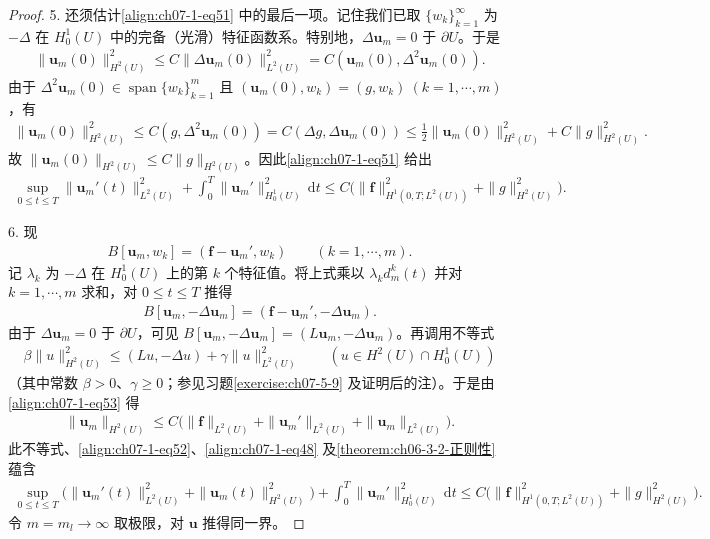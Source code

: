\documentclass[../../main.tex]{subfiles}
\begin{document}
\begin{proof}
5. 还须估计\eqref{align:ch07-1-eq51} 中的最后一项。记住我们已取 $\{w_k\}_{k=1}^\infty$ 为 $-\Delta$ 在 $H^1_0(U)$ 中的完备（光滑）特征函数系。特别地，$\Delta\mathbf{u}_m=0$ 于 $\partial U$。于是
\begin{align*}
\|\mathbf{u}_m(0)\|_{H^2(U)}^2 \leqslant C\|\Delta\mathbf{u}_m(0)\|_{L^2(U)}^2 = C(\mathbf{u}_m(0),\Delta^2\mathbf{u}_m(0)).
\end{align*}
由于 $\Delta^2\mathbf{u}_m(0)\in\operatorname{span}\{w_k\}_{k=1}^m$ 且 $(\mathbf{u}_m(0),w_k)=(g,w_k)\ (k=1,\cdots,m)$，有
\begin{align*}
\|\mathbf{u}_m(0)\|_{H^2(U)}^2 \leqslant C(g,\Delta^2\mathbf{u}_m(0)) = C(\Delta g,\Delta\mathbf{u}_m(0)) \leqslant \frac12\|\mathbf{u}_m(0)\|_{H^2(U)}^2 + C\|g\|_{H^2(U)}^2.
\end{align*}
故 $\|\mathbf{u}_m(0)\|_{H^2(U)}\leqslant C\|g\|_{H^2(U)}$。因此\eqref{align:ch07-1-eq51} 给出
\begin{align}
\sup_{0\leqslant t\leqslant T}\|\mathbf{u}_m'(t)\|_{L^2(U)}^2 + \int_0^T \|\mathbf{u}_m'\|_{H^1_0(U)}^2\,\mathrm{d}t
\leqslant C\bigl(\|\mathbf{f}\|_{H^1(0,T;L^2(U))}^2+\|g\|_{H^2(U)}^2\bigr).\label{align:ch07-1-eq52}
\end{align}

6. 现
\begin{align*}
B[\mathbf{u}_m,w_k]=(\mathbf{f}-\mathbf{u}_m',w_k)\qquad (k=1,\cdots,m).
\end{align*}
记 $\lambda_k$ 为 $-\Delta$ 在 $H^1_0(U)$ 上的第 $k$ 个特征值。将上式乘以 $\lambda_k d_m^k(t)$ 并对 $k=1,\cdots,m$ 求和，对 $0\leqslant t\leqslant T$ 推得
\begin{align}
B[\mathbf{u}_m,-\Delta\mathbf{u}_m]=(\mathbf{f}-\mathbf{u}_m',-\Delta\mathbf{u}_m).\label{align:ch07-1-eq53}
\end{align}
由于 $\Delta\mathbf{u}_m=0$ 于 $\partial U$，可见 $B[\mathbf{u}_m,-\Delta\mathbf{u}_m]=(L\mathbf{u}_m,-\Delta\mathbf{u}_m)$。再调用不等式
\begin{align}
\beta\|u\|_{H^2(U)}^2 \leqslant (Lu,-\Delta u)+\gamma\|u\|_{L^2(U)}^2\qquad (u\in H^2(U)\cap H^1_0(U))\label{align:ch07-1-eq54}
\end{align}
（其中常数 $\beta>0$、$\gamma\geqslant 0$；参见习题\cref{exercise:ch07-5-9} 及证明后的注）。于是由\eqref{align:ch07-1-eq53} 得
\begin{align*}
\|\mathbf{u}_m\|_{H^2(U)} \leqslant C\bigl(\|\mathbf{f}\|_{L^2(U)}+\|\mathbf{u}_m'\|_{L^2(U)}+\|\mathbf{u}_m\|_{L^2(U)}\bigr).
\end{align*}
此不等式、\eqref{align:ch07-1-eq52}、\eqref{align:ch07-1-eq48} 及\cref{theorem:ch06-3-2-正则性} 蕴含
\begin{align*}
\sup_{0\leqslant t\leqslant T}\bigl(\|\mathbf{u}_m'(t)\|_{L^2(U)}^2+\|\mathbf{u}_m(t)\|_{H^2(U)}^2\bigr) + \int_0^T \|\mathbf{u}_m'\|_{H^1_0(U)}^2\,\mathrm{d}t
\leqslant C\bigl(\|\mathbf{f}\|_{H^1(0,T;L^2(U))}^2+\|g\|_{H^2(U)}^2\bigr).
\end{align*}
令 $m=m_l\to\infty$ 取极限，对 $\mathbf{u}$ 推得同一界。


\end{proof}
\end{document}
